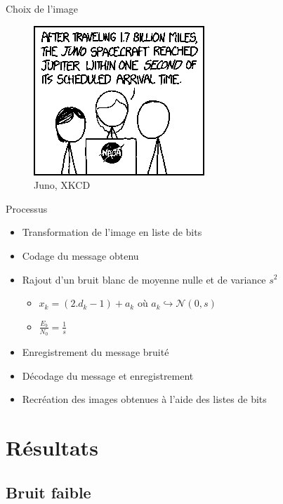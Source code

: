 \documentclass[11pt]{beamer}
\begin{document}
\begin{frame}{Choix de l'image}
	\begin{figure}
		\includegraphics[scale=0.8]{base}
		\caption{Juno, XKCD}
	\end{figure}
\end{frame}

\begin{frame}{Processus}
	\begin{itemize}
		\item Transformation de l'image en liste de bits
		\item Codage du message obtenu
		\item Rajout d'un bruit blanc de moyenne nulle et de variance $s^2$
		\begin{itemize}
			\item[] $x_k = (2.d_k - 1) + a_k$ o\`u $a_k \hookrightarrow \mathcal{N}(0, s)$
			\item[] $\frac{E_b}{N_0} = \frac{1}{s}$
		\end{itemize}
		\item Enregistrement du message bruit\'e
		\item D\'ecodage du message et enregistrement
		\item Recr\'eation des images obtenues \`a l'aide des listes de bits
	\end{itemize}
\end{frame}


\section{R\'esultats}
\subsection{Bruit faible}
\end{document}
